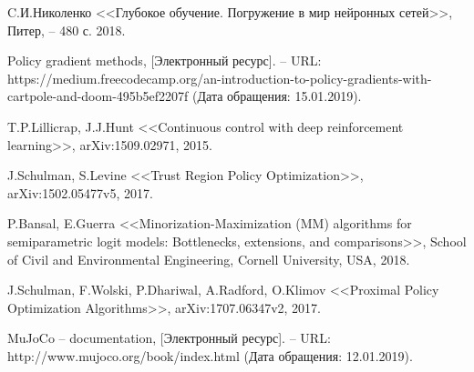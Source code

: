 \begin{thebibliography}{99}
	C.И.Николенко  
	<<Глубокое обучение. Погружение в мир нейронных сетей>>,
	Питер,  
	-- 480 с. 2018.


	Policy gradient methods,
	[Электронный ресурс]. --
	URL: https://medium.freecodecamp.org/an-introduction-to-policy-gradients-with-cartpole-and-doom-495b5ef2207f
	(Дата обращения: 15.01.2019).

	T.P.Lillicrap, J.J.Hunt
	<<Continuous control with deep reinforcement learning>>,
	arXiv:1509.02971, 
	2015.

	J.Schulman, S.Levine
	<<Trust Region Policy Optimization>>,
	arXiv:1502.05477v5, 
	2017.

	P.Bansal, E.Guerra
	<<Minorization-Maximization (MM) algorithms for semiparametric logit models: Bottlenecks, extensions, and comparisons>>,
	School of Civil and Environmental Engineering, Cornell University, USA, 
	2018.
	
	J.Schulman, F.Wolski, P.Dhariwal, A.Radford, O.Klimov
	<<Proximal Policy Optimization Algorithms>>,
	arXiv:1707.06347v2, 
	2017.

	MuJoCo -- documentation,
	[Электронный ресурс]. --
	URL: http://www.mujoco.org/book/index.html
	(Дата обращения: 12.01.2019).

\end{thebibliography}
\endgroup

\clearpage
